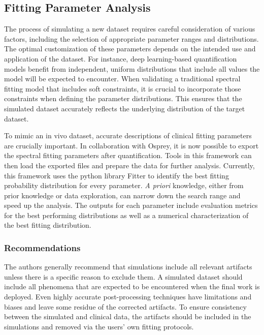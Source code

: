 \subsection{Fitting Parameter Analysis}\label{subsec:Fitting Parameter Analysis}
The process of simulating a new dataset requires careful consideration of various factors, including the selection of appropriate parameter ranges and distributions. The optimal customization of these parameters depends on the intended use and application of the dataset. For instance, deep learning-based quantification models benefit from independent, uniform distributions that include all values the model will be expected to encounter. When validating a traditional spectral fitting model that includes soft constraints, it is crucial to incorporate those constraints when defining the parameter distributions. This ensures that the simulated dataset accurately reflects the underlying distribution of the target dataset. 

To mimic an in vivo dataset, accurate descriptions of clinical fitting parameters are crucially important. In collaboration with Osprey, it is now possible to export the spectral fitting parameters after quantification. Tools in this framework can then load the exported files and prepare the data for further analysis. Currently, this framework uses the python library Fitter\cite{Cokelaer2019} to identify the best fitting probability distribution for every parameter. \textit{A priori} knowledge, either from prior knowledge or data exploration, can narrow down the search range and speed up the analysis. The outputs for each parameter include evaluation metrics for the best performing distributions as well as a numerical characterization of the best fitting distribution.
 
\subsubsection{Recommendations}
The authors generally recommend that simulations include all relevant artifacts unless there is a specific reason to exclude them. A simulated dataset should include all phenomena that are expected to be encountered when the final work is deployed. Even highly accurate post-processing techniques have limitations and biases and leave some residue of the corrected artifacts. To ensure consistency between the simulated and clinical data, the artifacts should be included in the simulations and removed via the users’ own fitting protocols.  

